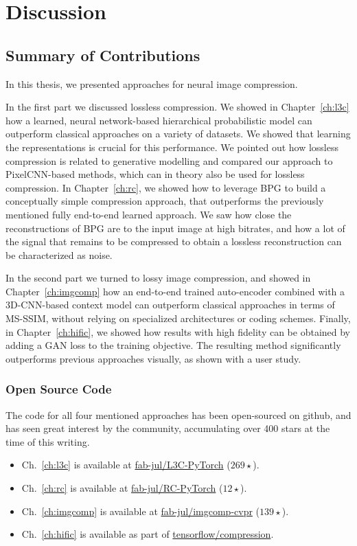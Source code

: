 \chapter{Discussion}
\label{sec:discussion}

\section{Summary of Contributions}

In this thesis, we presented approaches for neural image compression. 

In the first part we discussed lossless compression. We showed in
Chapter~\ref{ch:l3c} how a learned, neural network-based hierarchical
probabilistic model can outperform classical approaches on a variety of
datasets. We showed that learning the representations is crucial for this
performance. We pointed out how lossless compression is related to generative
modelling and compared our approach to PixelCNN-based methods, which can in
theory also be used for lossless compression.  In Chapter~\ref{ch:rc}, we
showed how to leverage BPG to build a conceptually simple compression approach,
that outperforms the previously mentioned fully end-to-end learned approach. We
saw how close the reconstructions of BPG are to the input image at high
bitrates, and how a lot of the signal that remains to be compressed to obtain a
lossless reconstruction can be characterized as noise.

In the second part we turned to lossy image compression, and showed in
Chapter~\ref{ch:imgcomp} how an end-to-end trained auto-encoder combined with a
3D-CNN-based context model can outperform classical approaches in terms of
MS-SSIM, without relying on specialized architectures or coding schemes.
Finally, in Chapter~\ref{ch:hific}, we showed how results with high fidelity
can be obtained by adding a GAN loss to the training objective. The resulting
method significantly outperforms previous approaches visually, as shown with a
user study.

\subsection{Open Source Code}

The code for all four mentioned approaches has been open-sourced on github, and
has seen great interest by the community, accumulating over 400 stars at the
time of this writing.
\begin{itemize}[noitemsep,topsep=0pt]
\item Ch.~\ref{ch:l3c} is available at \href{https://github.com/fab-jul/L3C-PyTorch}{fab-jul/L3C-PyTorch} ($269 \star$).
\item Ch.~\ref{ch:rc} is available at \href{https://github.com/fab-jul/RC-PyTorch}{fab-jul/RC-PyTorch} ($12 \star$).  %
\item Ch.~\ref{ch:imgcomp} is available at \href{https://github.com/fab-jul/imgcomp-cvpr}{fab-jul/imgcomp-cvpr} ($139 \star$).  %
\item Ch.~\ref{ch:hific} is available as part of \href{https://github.com/tensorflow/compression/tree/master/models/hific}{tensorflow/compression}.  %
\end{itemize}

